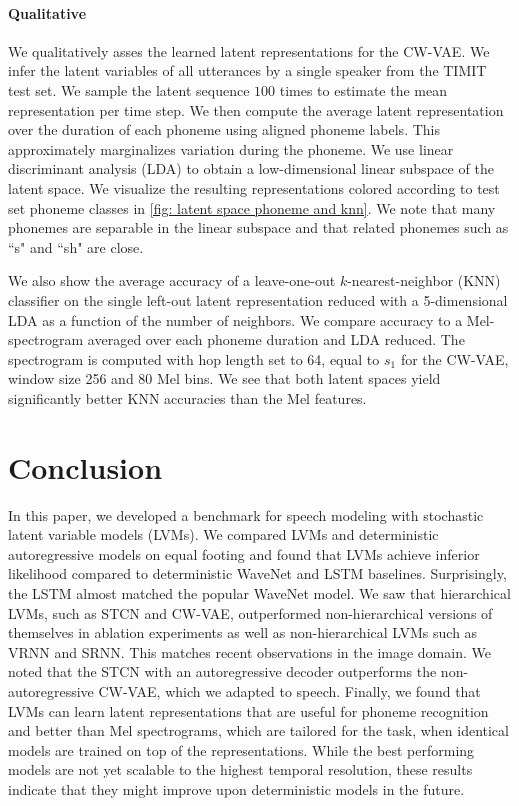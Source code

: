 {\paragraph{Qualitative}
We qualitatively asses the learned latent representations for the CW-VAE. 
We infer the latent variables of all utterances by a single speaker from the TIMIT test set. We sample the latent sequence $100$ times to estimate the mean representation per time step. We then compute the average latent representation over the duration of each phoneme using aligned phoneme labels. This approximately marginalizes variation during the phoneme. We use linear discriminant analysis (LDA) \cite{fisher_use_1936} to obtain a low-dimensional linear subspace of the latent space. 
We visualize the resulting representations colored according to test set phoneme classes in \cref{fig: latent space phoneme and knn}. We note that many phonemes are separable in the linear subspace and that related phonemes such as ``s" and ``sh" are close.

We also show the average accuracy of a leave-one-out $k$-nearest-neighbor (KNN) classifier on the single left-out latent representation reduced with a 5-dimensional LDA as a function of the number of neighbors. 
We compare accuracy to a Mel-spectrogram averaged over each phoneme duration and LDA reduced. The spectrogram is computed with hop length set to 64, equal to $s_1$ for the CW-VAE, window size 256 and 80 Mel bins.
We see that both latent spaces yield significantly better KNN accuracies than the Mel features.


\section{Conclusion}
In this paper, we developed a benchmark for speech modeling with stochastic latent variable models (LVMs). 
We compared LVMs and deterministic autoregressive models on equal footing and found that LVMs achieve inferior likelihood compared to deterministic WaveNet and LSTM baselines. Surprisingly, the LSTM almost matched the popular WaveNet model. 
We saw that hierarchical LVMs, such as STCN and CW-VAE, outperformed non-hierarchical versions of themselves in ablation experiments as well as non-hierarchical LVMs such as VRNN and SRNN. This matches recent observations in the image domain. 
We noted that the STCN with an autoregressive decoder outperforms the non-autoregressive CW-VAE, which we adapted to speech. 
Finally, we found that LVMs can learn latent representations that are useful for phoneme recognition and better than Mel spectrograms, which are tailored for the task, when identical models are trained on top of the representations.
While the best performing models are not yet scalable to the highest temporal resolution, these results indicate that they might improve upon deterministic models in the future. 


}
